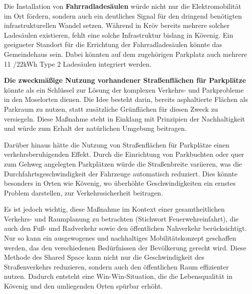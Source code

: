 Die Installation von \textbf{Fahrradladesäulen} würde nicht nur die Elektromobilität im Ort fördern, sondern auch ein deutliches Signal für den dringend benötigten infrastrukturellen Wandel setzen. Während in Kröv bereits mehrere solcher Ladesäulen existieren, fehlt eine solche Infrastruktur bislang in Kövenig. Ein geeigneter Standort für die Errichtung der Fahrradladesäulen könnte das Gemeindehaus sein. Dabei könnten auf dem zugehörigen Parkplatz auch mehrere 11 /22kWh Type 2 Ladesäulen integriert werden.

\textbf{Die zweckmäßige Nutzung vorhandener Straßenflächen für Parkplätze} könnte als ein Schlüssel zur Lösung der komplexen Verkehrs- und Parkprobleme in den Moselorten dienen. Die Idee besteht darin, bereits asphaltierte Flächen als Parkraum zu nutzen, statt zusätzliche Grünflächen für diesen Zweck zu versiegeln. Diese Maßnahme steht in Einklang mit Prinzipien der Nachhaltigkeit und würde zum Erhalt der natürlichen Umgebung beitragen.

Darüber hinaus hätte die Nutzung von Straßenflächen für Parkplätze einen verkehrsberuhigenden Effekt. Durch die Einrichtung von Parkbuchten oder quer zum Gehweg angelegten Parkplätzen würde die Straßenbreite variieren, was die Durchfahrtsgeschwindigkeit der Fahrzeuge automatisch reduziert. Dies könnte besonders in Orten wie Kövenig, wo überhöhte Geschwindigkeiten ein ernstes Problem darstellen, zur Verkehrssicherheit beitragen. 

Es ist jedoch wichtig, diese Maßnahme im Kontext einer gesamtheitlichen Verkehrs- und Raumplanung zu betrachten (Stichwort Feuerwehreinfahrt), die auch den Fuß- und Radverkehr sowie den öffentlichen Nahverkehr berücksichtigt. Nur so kann ein ausgewogenes und nachhaltiges Mobilitätskonzept geschaffen werden, das den verschiedenen Bedürfnissen der Bevölkerung gerecht wird.
Diese Methode des Shared Space kann nicht nur die Geschwindigkeit des Straßenverkehrs reduzieren, sondern auch den öffentlichen Raum effizienter nutzen. Dadurch entsteht eine Win-Win-Situation, die die Lebensqualität in Kövenig und den umliegenden Orten spürbar erhöht.
